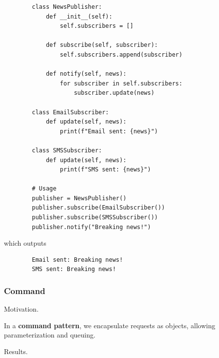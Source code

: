     \begin{example}
      \label{ex:news-publisher}
      \begin{lstlisting}
        class NewsPublisher:
            def __init__(self):
                self.subscribers = []
            
            def subscribe(self, subscriber):
                self.subscribers.append(subscriber)
            
            def notify(self, news):
                for subscriber in self.subscribers:
                    subscriber.update(news)

        class EmailSubscriber:
            def update(self, news):
                print(f"Email sent: {news}")

        class SMSSubscriber:
            def update(self, news):
                print(f"SMS sent: {news}")

        # Usage
        publisher = NewsPublisher()
        publisher.subscribe(EmailSubscriber())
        publisher.subscribe(SMSSubscriber())
        publisher.notify("Breaking news!")
      \end{lstlisting}

      which outputs 
      \begin{lstlisting}
        Email sent: Breaking news!
        SMS sent: Breaking news!
      \end{lstlisting}
    \end{example}

  \subsubsection{Command} 

    Motivation. 

    \begin{definition}
      \label{def:command-pattern}
      In a \textbf{command pattern}, we encapsulate requests as objects, allowing parameterization and queuing.
    \end{definition}

    Results. 


